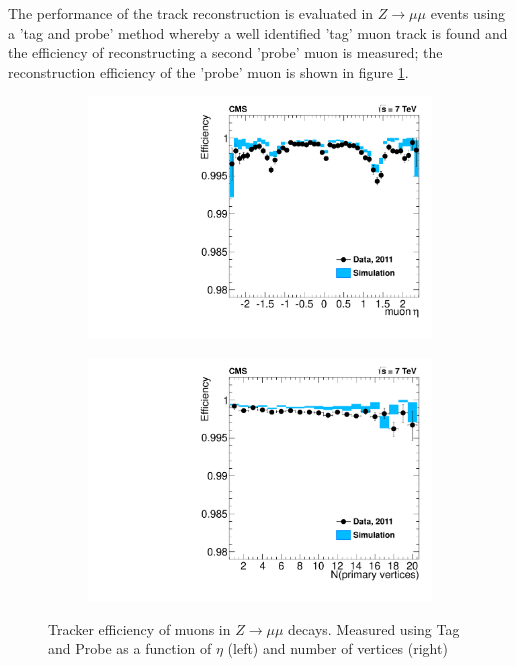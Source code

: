 The performance of the track reconstruction is evaluated in 
$Z\rightarrow \mu\mu$ events using a 'tag and probe'
method whereby a well identified 'tag' muon track is found
and the efficiency of reconstructing a second 'probe' muon is measured; 
the reconstruction efficiency of the 'probe' muon is shown 
in figure \ref{fig:TrackerPerformance}.
\begin{figure}[t]
  \centering
 \begin{subfigure}[b]{.4\textwidth}
	\includegraphics[width=\textwidth]{images/TrackerEffEta.pdf}
  \end{subfigure}
  \begin{subfigure}[b]{.4\textwidth}
	\includegraphics[width=\textwidth]{images/TrackerEffVtx.pdf}
  \end{subfigure}
  	\caption[Tracker Performance]
   	{Tracker efficiency of muons in $Z\rightarrow\mu\mu$ decays. Measured using Tag and Probe as a function of $\eta$ (left) and number of vertices (right)\cite{TRK11001}}
	\label{fig:TrackerPerformance}
\end{figure}
